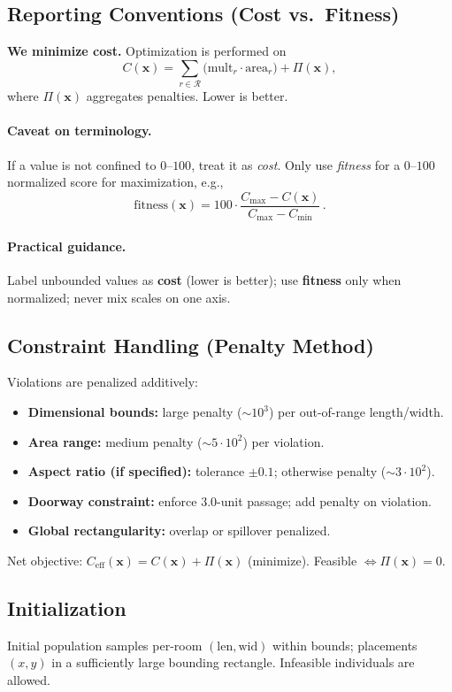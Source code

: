 \documentclass{article}
\begin{document}
\subsection{Reporting Conventions (Cost vs.\ Fitness)}
\textbf{We minimize cost.} Optimization is performed on
\[
C(\mathbf{x}) = \sum_{r \in \mathcal{R}} \big(\text{mult}_r \cdot \text{area}_r \big) + \Pi(\mathbf{x}),
\]
where $\Pi(\mathbf{x})$ aggregates penalties. Lower is better.

\paragraph{Caveat on terminology.}
If a value is not confined to $0$--$100$, treat it as \emph{cost}. Only use \emph{fitness} for a $0$--$100$ normalized score for maximization, e.g.,
\[
\mathrm{fitness}(\mathbf{x}) = 100 \cdot \frac{C_{\max} - C(\mathbf{x})}{C_{\max} - C_{\min}}\,.
\]

\paragraph{Practical guidance.}
Label unbounded values as \textbf{cost} (lower is better); use \textbf{fitness} only when normalized; never mix scales on one axis.

\subsection{Constraint Handling (Penalty Method)}\label{sec:penalties}
Violations are penalized additively:
\begin{itemize}
    \item \textbf{Dimensional bounds:} large penalty ($\sim10^3$) per out-of-range length/width.
    \item \textbf{Area range:} medium penalty ($\sim5\cdot10^2$) per violation.
    \item \textbf{Aspect ratio (if specified):} tolerance $\pm0.1$; otherwise penalty ($\sim3\cdot10^2$).
    \item \textbf{Doorway constraint:} enforce $3.0$-unit passage; add penalty on violation.
    \item \textbf{Global rectangularity:} overlap or spillover penalized.
\end{itemize}
Net objective: $C_{\mathrm{eff}}(\mathbf{x}) = C(\mathbf{x}) + \Pi(\mathbf{x})$ (minimize). Feasible $\Leftrightarrow \Pi(\mathbf{x})=0$.

\subsection{Initialization}
Initial population samples per-room $(\text{len},\text{wid})$ within bounds; placements $(x,y)$ in a sufficiently large bounding rectangle. Infeasible individuals are allowed.
\end{document}
